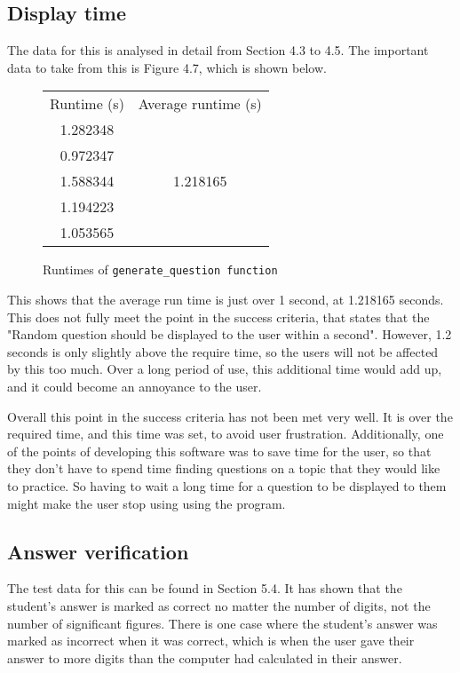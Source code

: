 \subsection{Display time}
The data for this is analysed in detail from Section 4.3 to 4.5. The important data to take from this is Figure 4.7, which is shown below.
\begin{figure}[H]
	\centering
	\begin{tabular}{|c|c|}
		\hline
		Runtime (s) & Average runtime (s)       \\
		
		1.282348    &  \multirow{5}{*}{1.218165}\\
		
		0.972347    &                           \\
		
		1.588344    &                           \\
		
		1.194223    &                           \\
		
		1.053565    &\\
		\hline       
	\end{tabular}
	\caption{Runtimes of \texttt{generate\_question function}}
\end{figure}
This shows that the average run time is just over 1 second, at 1.218165 seconds. This does not fully meet the point in the success criteria, that states that the "Random question should be displayed to the user within a second". However, 1.2 seconds is only slightly above the require time, so the users will not be affected by this too much. Over a long period of use, this additional time would add up, and it could become an annoyance to the user.

Overall this point in the success criteria has not been met very well. It is over the required time, and this time was set, to avoid user frustration. Additionally, one of the points of developing this software was to save time for the user, so that they don't have to spend time finding questions on a topic that they would like to practice. So having to wait a long time for a question to be displayed to them might make the user stop using using the program.
\subsection{Answer verification}
The test data for this can be found in Section 5.4. It has shown that the student's answer is marked as correct no matter the number of digits, not the number of significant figures. There is one case where the student's answer was marked as incorrect when it was correct, which is when the user gave their answer to more digits than the computer had calculated in their answer.

